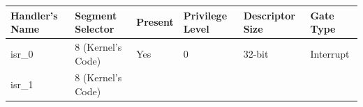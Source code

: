 \begin{longtable}[]{@{}llllll@{}}
\toprule
\begin{minipage}[b]{0.15\columnwidth}\raggedright\strut
Handler's Name\strut
\end{minipage} & \begin{minipage}[b]{0.18\columnwidth}\raggedright\strut
Segment Selector\strut
\end{minipage} & \begin{minipage}[b]{0.09\columnwidth}\raggedright\strut
Present\strut
\end{minipage} & \begin{minipage}[b]{0.16\columnwidth}\raggedright\strut
Privilege Level\strut
\end{minipage} & \begin{minipage}[b]{0.16\columnwidth}\raggedright\strut
Descriptor Size\strut
\end{minipage} & \begin{minipage}[b]{0.11\columnwidth}\raggedright\strut
Gate Type\strut
\end{minipage}\tabularnewline
\midrule
\endhead
\begin{minipage}[t]{0.15\columnwidth}\raggedright\strut
isr\_0\strut
\end{minipage} & \begin{minipage}[t]{0.18\columnwidth}\raggedright\strut
8 (Kernel's Code)\strut
\end{minipage} & \begin{minipage}[t]{0.09\columnwidth}\raggedright\strut
Yes\strut
\end{minipage} & \begin{minipage}[t]{0.16\columnwidth}\raggedright\strut
0\strut
\end{minipage} & \begin{minipage}[t]{0.16\columnwidth}\raggedright\strut
32-bit\strut
\end{minipage} & \begin{minipage}[t]{0.11\columnwidth}\raggedright\strut
Interrupt\strut
\end{minipage}\tabularnewline
\begin{minipage}[t]{0.15\columnwidth}\raggedright\strut
isr\_1\strut
\end{minipage} & \begin{minipage}[t]{0.18\columnwidth}\raggedright\strut
8 (Kernel's Code)\strut
\end{minipage} & \begin{minipage}[t]{0.09\columnwidth}\raggedright\strut

\end{minipage}
\end{longtable}
